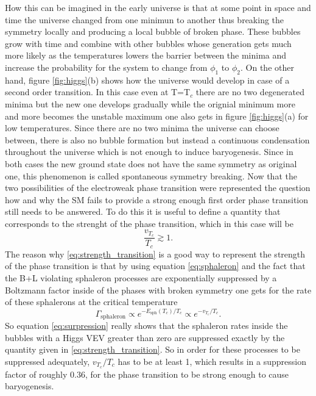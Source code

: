 How this can be imagined in the early universe is that at some point in space and time the universe changed from one minimun to another thus breaking the symmetry locally and producing a local bubble of broken phase. These bubbles grow with time and combine with other bubbles whose generation gets much more likely as the temperatures lowers the barrier between the minima and increase the probability for the system to change from $\phi_1$ to $\phi_2$. \newline\indent
On the other hand, figure \ref{fig:higgs}(b) shows how the universe would develop in case of a second order transition. In this case even at T=T$_c$ there are no two degenerated minima but the new one develops gradually while the orignial minimum more and more becomes the unstable maximum one also gets in figure \ref{fig:higgs}(a) for low temperatures. Since there are no two minima the universe can choose between, there is also no bubble formation but instead a continuous condensation throughout the universe which is not enough to induce baryogenesis. Since in both cases the new ground state does not have the same symmetry as original one, this phenomenon is called spontaneous symmetry breaking.\newline\indent
Now that the two possibilities of the electroweak phase transition were represented the question how and why the SM fails to provide a strong enough first order phase transition still needs to be answered. \newline\indent
To do this it is useful to define a quantity that corresponds to the strenght of the phase transition, which in this case will be 
\begin{equation}
	\frac{v_{T_c}}{T_c}\gtrsim1.
	\label{eq:strength_transition}
\end{equation}
The reason why \eqref{eq:strength_transition} is a good way to represent the strength of the phase transition is that by using equation \eqref{eq:sphaleron} and the fact that the B+L violating sphaleron processes are exponentially suppressed by a Boltzmann factor inside of the phases with broken symmetry one gets for the rate of these sphalerons at the critical temperature
\begin{equation}
	\Gamma_\text{sphaleron}\propto e^{-E_\text{sph}(T_c)/T_c}\propto e^{-v_{T_c}/T_c}.
	\label{eq:surpression}
\end{equation}
So equation \eqref{eq:surpression} really shows that the sphaleron rates inside the bubbles with a Higgs VEV greater than zero are suppressed exactly by the quantity given in \eqref{eq:strength_transition}. So in order for these processes to be suppressed adequately, $v_{T_c}/T_c$ has to be at least 1, which results in a suppression factor of roughly 0.36, for the phase transition to be strong enough to cause baryogenesis. \newline\indent 
